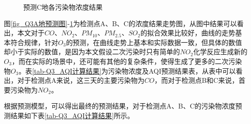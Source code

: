 \documentclass[a4paper,10pt]{my_paper}
\numberwithin{equation}{section}
\begin{document}
\begin{figure}[htbp]
\begin{minipage}[c]{0.3\textwidth}
		\end{minipage}
\caption{预测C地各污染物浓度结果}\label{fig_Q3C地预测图}
\end{figure}

图\ref{fig_Q3A地预测图}-\ref{fig_Q3C地预测图}为检测点A、B、C的浓度结果走势图，从图中结果可以看出，本文对于${CO}$、${NO_2}$、${PM_{10}}$、${PM_{2.5}}$、${SO_2}$的拟合效果比较好，曲线的走势基本符合规律，针对${O_3}$的预测，在曲线走势上基本和实际数据一致，但具体的数值却小于实际的数值，是因为本文假设二次污染时只有简单的${NO_2}$化学反应生成新的${O_3}$，而在实际的场景中，还可能有其他的复杂条件，使得生成了更多的二次污染物${O_3}$。表\ref{tab-Q3_AQI计算结果}为污染物浓度及AQI预测结果表，从表中可以看出，对于检测点A来说，这三天的主要污染物为${CO}$，而对于检测点B和C来说，首要污染物为${NO_2}$。


根据预测模型，可以得出最终的预测结果，对于检测点A、B、C的污染物浓度预测结果如下表\ref{tab-Q3_AQI计算结果}所示。
\end{document}
